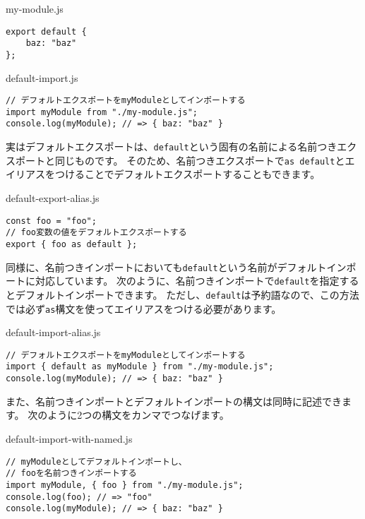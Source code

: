 \begin{listtitle}
my-module.js
\end{listtitle}
\begin{lstlisting}
export default {
    baz: "baz"
};
\end{lstlisting}
\listend

\begin{listtitle}
default-import.js
\end{listtitle}
\begin{lstlisting}
// デフォルトエクスポートをmyModuleとしてインポートする
import myModule from "./my-module.js";
console.log(myModule); // => { baz: "baz" }
\end{lstlisting}
\listend

実はデフォルトエクスポートは、\texttt{default}という固有の名前による名前つきエクスポートと同じものです。
そのため、名前つきエクスポートで\texttt{as default}とエイリアスをつけることでデフォルトエクスポートすることもできます。

\begin{listtitle}
default-export-alias.js
\end{listtitle}
\begin{lstlisting}
const foo = "foo";
// foo変数の値をデフォルトエクスポートする
export { foo as default };
\end{lstlisting}
\listend

同様に、名前つきインポートにおいても\texttt{default}という名前がデフォルトインポートに対応しています。
次のように、名前つきインポートで\texttt{default}を指定するとデフォルトインポートできます。
ただし、\texttt{default}は予約語なので、この方法では必ず\texttt{as}構文を使ってエイリアスをつける必要があります。

\begin{listtitle}
default-import-alias.js
\end{listtitle}
\begin{lstlisting}
// デフォルトエクスポートをmyModuleとしてインポートする
import { default as myModule } from "./my-module.js";
console.log(myModule); // => { baz: "baz" }
\end{lstlisting}
\listend

また、名前つきインポートとデフォルトインポートの構文は同時に記述できます。
次のように2つの構文をカンマでつなげます。

\begin{listtitle}
default-import-with-named.js
\end{listtitle}
\begin{lstlisting}
// myModuleとしてデフォルトインポートし、
// fooを名前つきインポートする
import myModule, { foo } from "./my-module.js";
console.log(foo); // => "foo"
console.log(myModule); // => { baz: "baz" }
\end{lstlisting}
\listend

